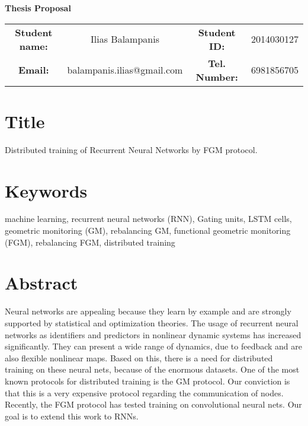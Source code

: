 \documentclass{article}
\begin{document}
    \begin{center}
        \LARGE{\textbf{Thesis Proposal}}\\[.5cm]
    \end{center}
    \begin{table}[h!]
        \begin{tabular}{ c c c c }
            \textbf{Student name:} & Ilias Balampanis & \textbf{Student ID:} & 2014030127  \\
            \textbf{Email:} & balampanis.ilias@gmail.com &  \textbf{Tel. Number:} & 6981856705 \\
        \end{tabular}
    \end{table}


    \section*{Title}
    Distributed training of Recurrent Neural Networks by FGM protocol.

    \section*{Keywords}
    machine learning, recurrent neural networks (RNN), Gating units, LSTM cells, geometric monitoring (GM), rebalancing GM, functional geometric monitoring (FGM), rebalancing FGM, distributed training

    \section*{Abstract}
    Neural networks are appealing because they learn by example and are strongly supported by statistical and optimization theories. The usage of recurrent neural networks as identifiers and predictors in nonlinear dynamic systems has increased significantly. They can present a wide range of dynamics, due to feedback and are also flexible nonlinear maps. Based on this, there is a need for distributed training on these neural nets, because of the enormous datasets. One of the most known protocols for distributed training is the GM protocol. Our conviction is that this is a very expensive protocol regarding the communication of nodes. Recently, the FGM protocol has tested training on convolutional neural nets. Our goal is to extend this work to RNNs.
\end{document}
